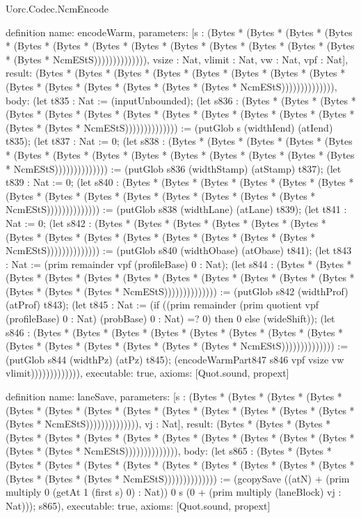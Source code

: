 \begin{lexlean}{Uorc.Codec.NcmEncode}
\begin{semanticmodule}
definition{
  name: encodeWarm,
  parameters: [s : (Bytes * (Bytes * (Bytes * (Bytes * (Bytes * (Bytes * (Bytes * (Bytes * (Bytes * (Bytes * (Bytes * (Bytes * (Bytes * (Bytes * NcmEStS)))))))))))))), vsize : Nat, vlimit : Nat, vw : Nat, vpf : Nat],
  result: (Bytes * (Bytes * (Bytes * (Bytes * (Bytes * (Bytes * (Bytes * (Bytes * (Bytes * (Bytes * (Bytes * (Bytes * (Bytes * (Bytes * NcmEStS)))))))))))))),
  body: (let t835 : Nat := (inputUnbounded); (let s836 : (Bytes * (Bytes * (Bytes * (Bytes * (Bytes * (Bytes * (Bytes * (Bytes * (Bytes * (Bytes * (Bytes * (Bytes * (Bytes * (Bytes * NcmEStS)))))))))))))) := (putGlob s (widthIend) (atIend) t835); (let t837 : Nat := 0; (let s838 : (Bytes * (Bytes * (Bytes * (Bytes * (Bytes * (Bytes * (Bytes * (Bytes * (Bytes * (Bytes * (Bytes * (Bytes * (Bytes * (Bytes * NcmEStS)))))))))))))) := (putGlob s836 (widthStamp) (atStamp) t837); (let t839 : Nat := 0; (let s840 : (Bytes * (Bytes * (Bytes * (Bytes * (Bytes * (Bytes * (Bytes * (Bytes * (Bytes * (Bytes * (Bytes * (Bytes * (Bytes * (Bytes * NcmEStS)))))))))))))) := (putGlob s838 (widthLane) (atLane) t839); (let t841 : Nat := 0; (let s842 : (Bytes * (Bytes * (Bytes * (Bytes * (Bytes * (Bytes * (Bytes * (Bytes * (Bytes * (Bytes * (Bytes * (Bytes * (Bytes * (Bytes * NcmEStS)))))))))))))) := (putGlob s840 (widthObase) (atObase) t841); (let t843 : Nat := (prim remainder vpf (profileBase) 0 : Nat); (let s844 : (Bytes * (Bytes * (Bytes * (Bytes * (Bytes * (Bytes * (Bytes * (Bytes * (Bytes * (Bytes * (Bytes * (Bytes * (Bytes * (Bytes * NcmEStS)))))))))))))) := (putGlob s842 (widthProf) (atProf) t843); (let t845 : Nat := (if ((prim remainder (prim quotient vpf (profileBase) 0 : Nat) (probBase) 0 : Nat) =? 0) then 0 else (wideShift)); (let s846 : (Bytes * (Bytes * (Bytes * (Bytes * (Bytes * (Bytes * (Bytes * (Bytes * (Bytes * (Bytes * (Bytes * (Bytes * (Bytes * (Bytes * NcmEStS)))))))))))))) := (putGlob s844 (widthPz) (atPz) t845); (encodeWarmPart847 s846 vpf vsize vw vlimit))))))))))))),
  executable: true,
  axioms: [Quot.sound, propext]
}

definition{
  name: laneSave,
  parameters: [s : (Bytes * (Bytes * (Bytes * (Bytes * (Bytes * (Bytes * (Bytes * (Bytes * (Bytes * (Bytes * (Bytes * (Bytes * (Bytes * (Bytes * NcmEStS)))))))))))))), vj : Nat],
  result: (Bytes * (Bytes * (Bytes * (Bytes * (Bytes * (Bytes * (Bytes * (Bytes * (Bytes * (Bytes * (Bytes * (Bytes * (Bytes * (Bytes * NcmEStS)))))))))))))),
  body: (let s865 : (Bytes * (Bytes * (Bytes * (Bytes * (Bytes * (Bytes * (Bytes * (Bytes * (Bytes * (Bytes * (Bytes * (Bytes * (Bytes * (Bytes * NcmEStS)))))))))))))) := (gcopySave ((atN) + (prim multiply 0 (getAt 1 (first s) 0) : Nat)) 0 s (0 + (prim multiply (laneBlock) vj : Nat))); s865),
  executable: true,
  axioms: [Quot.sound, propext]
}


\end{semanticmodule}
\end{lexlean}
